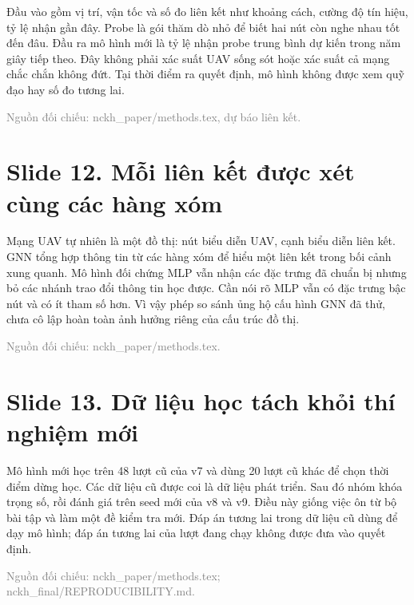Đầu vào gồm vị trí, vận tốc và số đo liên kết như khoảng cách, cường độ tín hiệu, tỷ lệ nhận gần đây. Probe là gói thăm dò nhỏ để biết hai nút còn nghe nhau tốt đến đâu. Đầu ra mô hình mới là tỷ lệ nhận probe trung bình dự kiến trong năm giây tiếp theo. Đây không phải xác suất UAV sống sót hoặc xác suất cả mạng chắc chắn không đứt. Tại thời điểm ra quyết định, mô hình không được xem quỹ đạo hay số đo tương lai.

{\small\textcolor{gray}{Nguồn đối chiếu: nckh\_paper/methods.tex, dự báo liên kết.}}




\section*{Slide 12. Mỗi liên kết được xét cùng các hàng xóm}


Mạng UAV tự nhiên là một đồ thị: nút biểu diễn UAV, cạnh biểu diễn liên kết. GNN tổng hợp thông tin từ các hàng xóm để hiểu một liên kết trong bối cảnh xung quanh. Mô hình đối chứng MLP vẫn nhận các đặc trưng đã chuẩn bị nhưng bỏ các nhánh trao đổi thông tin học được. Cần nói rõ MLP vẫn có đặc trưng bậc nút và có ít tham số hơn. Vì vậy phép so sánh ủng hộ cấu hình GNN đã thử, chưa cô lập hoàn toàn ảnh hưởng riêng của cấu trúc đồ thị.

{\small\textcolor{gray}{Nguồn đối chiếu: nckh\_paper/methods.tex.}}




\section*{Slide 13. Dữ liệu học tách khỏi thí nghiệm mới}


Mô hình mới học trên 48 lượt cũ của v7 và dùng 20 lượt cũ khác để chọn thời điểm dừng học. Các dữ liệu cũ được coi là dữ liệu phát triển. Sau đó nhóm khóa trọng số, rồi đánh giá trên seed mới của v8 và v9. Điều này giống việc ôn từ bộ bài tập và làm một đề kiểm tra mới. Đáp án tương lai trong dữ liệu cũ dùng để dạy mô hình; đáp án tương lai của lượt đang chạy không được đưa vào quyết định.

{\small\textcolor{gray}{Nguồn đối chiếu: nckh\_paper/methods.tex; nckh\_final/REPRODUCIBILITY.md.}}



